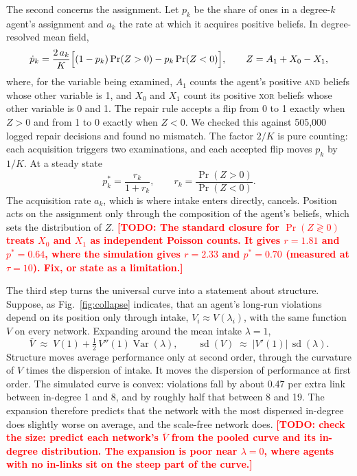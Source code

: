 \documentclass[11pt]{article}
\newcommand{\todo}[1]{\textcolor{red}{\textbf{[TODO: #1]}}}
\begin{document}
The second concerns the assignment. Let $p_k$ be the share of ones in a degree-$k$ agent's assignment and $a_k$ the rate at which it acquires positive beliefs. In degree-resolved mean field,
\[
\dot p_k = \frac{2\,a_k}{K}\Bigl[(1 - p_k)\Pr(Z > 0) - p_k\Pr(Z < 0)\Bigr],
\qquad Z = A_1 + X_0 - X_1,
\]
where, for the variable being examined, $A_1$ counts the agent's positive \textsc{and} beliefs whose other variable is 1, and $X_0$ and $X_1$ count its positive \textsc{xor} beliefs whose other variable is 0 and 1. The repair rule accepts a flip from 0 to 1 exactly when $Z > 0$ and from 1 to 0 exactly when $Z < 0$. We checked this against 505,000 logged repair decisions and found no mismatch. The factor $2/K$ is pure counting: each acquisition triggers two examinations, and each accepted flip moves $p_k$ by $1/K$. At a steady state
\[
p_k^{*} = \frac{r_k}{1 + r_k}, \qquad r_k = \frac{\Pr(Z > 0)}{\Pr(Z < 0)}.
\]
The acquisition rate $a_k$, which is where intake enters directly, cancels. Position acts on the assignment only through the composition of the agent's beliefs, which sets the distribution of $Z$. \todo{The standard closure for $\Pr(Z \gtrless 0)$ treats $X_0$ and $X_1$ as independent Poisson counts. It gives $r = 1.81$ and $p^{*} = 0.64$, where the simulation gives $r = 2.33$ and $p^{*} = 0.70$ (measured at $\tau = 10$). Fix, or state as a limitation.}

The third step turns the universal curve into a statement about structure. Suppose, as Fig.~\ref{fig:collapse} indicates, that an agent's long-run violations depend on its position only through intake, $V_i \approx V(\lambda_i)$, with the same function $V$ on every network. Expanding around the mean intake $\lambda = 1$,
\[
\bar V \;\approx\; V(1) + \tfrac{1}{2}\,V''(1)\operatorname{Var}(\lambda),
\qquad
\operatorname{sd}(V) \;\approx\; \lvert V'(1)\rvert\,\operatorname{sd}(\lambda).
\]
Structure moves average performance only at second order, through the curvature of $V$ times the dispersion of intake. It moves the dispersion of performance at first order. The simulated curve is convex: violations fall by about 0.47 per extra link between in-degree 1 and 8, and by roughly half that between 8 and 19. The expansion therefore predicts that the network with the most dispersed in-degree does slightly worse on average, and the scale-free network does. \todo{check the size: predict each network's $\bar V$ from the pooled curve and its in-degree distribution. The expansion is poor near $\lambda = 0$, where agents with no in-links sit on the steep part of the curve.}
\end{document}

